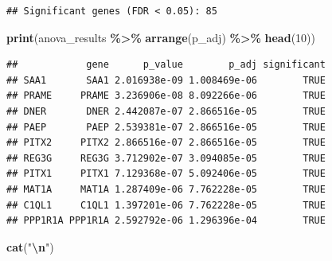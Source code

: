 \documentclass[
]{article}
\newenvironment{Shaded}{\begin{snugshade}}{\end{snugshade}}
\newcommand{\AttributeTok}[1]{\textcolor[rgb]{0.13,0.29,0.53}{#1}}
\newcommand{\CommentTok}[1]{\textcolor[rgb]{0.56,0.35,0.01}{\textit{#1}}}
\newcommand{\ConstantTok}[1]{\textcolor[rgb]{0.56,0.35,0.01}{#1}}
\newcommand{\DecValTok}[1]{\textcolor[rgb]{0.00,0.00,0.81}{#1}}
\newcommand{\FunctionTok}[1]{\textcolor[rgb]{0.13,0.29,0.53}{\textbf{#1}}}
\newcommand{\NormalTok}[1]{#1}
\newcommand{\OtherTok}[1]{\textcolor[rgb]{0.56,0.35,0.01}{#1}}
\newcommand{\SpecialCharTok}[1]{\textcolor[rgb]{0.81,0.36,0.00}{\textbf{#1}}}
\newcommand{\StringTok}[1]{\textcolor[rgb]{0.31,0.60,0.02}{#1}}
\begin{document}
\begin{verbatim}
## Significant genes (FDR < 0.05): 85
\end{verbatim}

\begin{Shaded}
\begin{Highlighting}[]
\FunctionTok{print}\NormalTok{(anova\_results }\SpecialCharTok{\%\textgreater{}\%} \FunctionTok{arrange}\NormalTok{(p\_adj) }\SpecialCharTok{\%\textgreater{}\%} \FunctionTok{head}\NormalTok{(}\DecValTok{10}\NormalTok{))}
\end{Highlighting}
\end{Shaded}

\begin{verbatim}
##            gene      p_value        p_adj significant
## SAA1       SAA1 2.016938e-09 1.008469e-06        TRUE
## PRAME     PRAME 3.236906e-08 8.092266e-06        TRUE
## DNER       DNER 2.442087e-07 2.866516e-05        TRUE
## PAEP       PAEP 2.539381e-07 2.866516e-05        TRUE
## PITX2     PITX2 2.866516e-07 2.866516e-05        TRUE
## REG3G     REG3G 3.712902e-07 3.094085e-05        TRUE
## PITX1     PITX1 7.129368e-07 5.092406e-05        TRUE
## MAT1A     MAT1A 1.287409e-06 7.762228e-05        TRUE
## C1QL1     C1QL1 1.397201e-06 7.762228e-05        TRUE
## PPP1R1A PPP1R1A 2.592792e-06 1.296396e-04        TRUE
\end{verbatim}

\begin{Shaded}
\begin{Highlighting}[]
\FunctionTok{cat}\NormalTok{(}\StringTok{"}\SpecialCharTok{\textbackslash{}n}\StringTok{"}\NormalTok{)}
\end{Highlighting}
\end{Shaded}

\begin{Shaded}
\end{Shaded}
\end{document}

